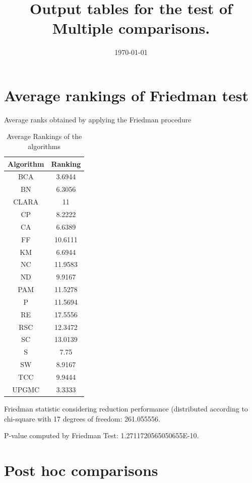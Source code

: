 \documentclass[a4paper,10pt]{article}
\title{Output tables for the test of Multiple comparisons.}
\author{}
\date{\today}
\begin{document}
\begin{landscape}
\pagestyle{empty}
\maketitle
\thispagestyle{empty}
\section{Average rankings of Friedman test}



Average ranks obtained by applying the Friedman procedure

\begin{table}[!htp]
\centering
\begin{tabular}{|c|c|}\hline
Algorithm&Ranking\\\hline
BCA & 3.6944\\
BN & 6.3056\\
CLARA & 11\\
CP & 8.2222\\
CA & 6.6389\\
FF & 10.6111\\
KM & 6.6944\\
NC & 11.9583\\
ND & 9.9167\\
PAM & 11.5278\\
P & 11.5694\\
RE & 17.5556\\
RSC & 12.3472\\
SC & 13.0139\\
S & 7.75\\
SW & 8.9167\\
TCC & 9.9444\\
UPGMC & 3.3333\\
\hline
\end{tabular}
\caption{Average Rankings of the algorithms}
\end{table}

Friedman statistic considering reduction performance (distributed according to chi-square with 17 degrees of freedom: 261.055556.

P-value computed by Friedman Test: 1.2711720565050655E-10.\newline



\pagebreak

\section{Post hoc comparisons}


\end{landscape}
\end{document}
